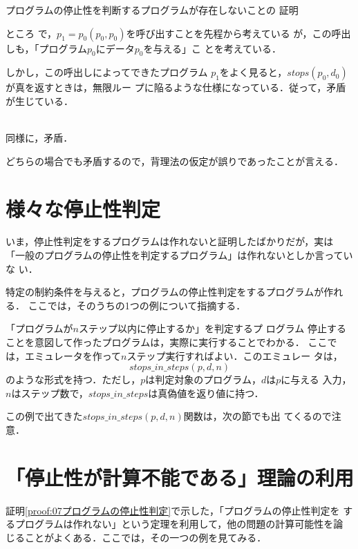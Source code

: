 \begin{myproof}{プログラムの停止性を判断するプログラムが存在しないことの
 証明}
\begin{description}
            ところ
            で，$p_1 = p_0 (p_0, p_0)$を呼び出すことを先程から考えている
            が，この呼出しも，「プログラム$p_0$にデータ$p_0$を与える」こ
            とを考えている．

            しかし，この呼出しによってできたプログラム
            $p_1$をよく見ると，$stops(p_0,d_0)$が真を返すときは，無限ルー
            プに陥るような仕様になっている．従って，矛盾が生じている．

 \item[偽を返す] \mbox{} \\
            同様に，矛盾．
\end{description}
どちらの場合でも矛盾するので，背理法の仮定が誤りであったことが言える．
\end{myproof}


\section{様々な停止性判定}
いま，停止性判定をするプログラムは作れないと証明したばかりだが，実は
「一般のプログラムの停止性を判定するプログラム」は作れないとしか言っていな
い．

特定の制約条件を与えると，プログラムの停止性判定をするプログラムが作れる．
ここでは，そのうちの1つの例について指摘する．

\begin{myexample}{「プログラムが$n$ステップ以内に停止するか」を判定するプ
 ログラム}
 停止することを意図して作ったプログラムは，実際に実行することでわかる．
 ここでは，エミュレータ\footnotemark を作って$n$ステップ実行すればよい．このエミュレー
 タは，
 \[
 stops\_in\_steps(p, d, n)
 \]
 のような形式を持つ．ただし，$p$は判定対象のプログラム，$d$は$p$に与える
 入力，$n$はステップ数で，$stops\_in\_steps$は真偽値を返り値に持つ．
\end{myexample}
この例で出てきた$stops\_in\_steps(p, d, n)$関数は，次の節でも出
てくるので注意．

\section{「停止性が計算不能である」理論の利用}
証明\ref{proof:07プログラムの停止性判定}で示した，「プログラムの停止性判定を
するプログラムは作れない」という定理を利用して，他の問題の計算可能性を論
じることがよくある．ここでは，その一つの例を見てみる．

